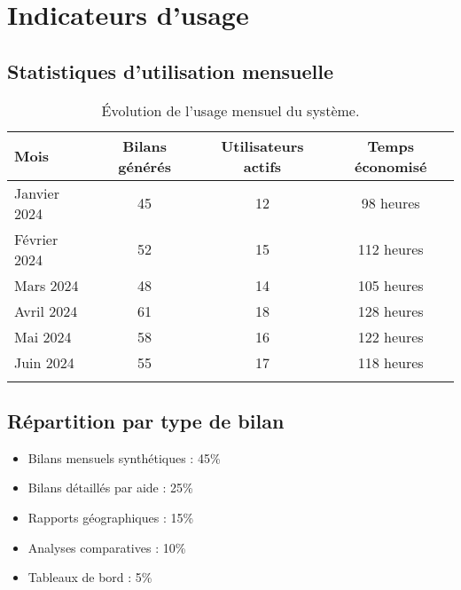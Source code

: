 \section{Indicateurs d'usage}

\subsection{Statistiques d'utilisation mensuelle}

\begin{longtable}{|l|c|c|c|}
    \hline
    \textbf{Mois} & \textbf{Bilans générés} & \textbf{Utilisateurs actifs} & \textbf{Temps économisé} \\ \hline
    Janvier 2024  & 45                      & 12                           & 98 heures                \\ \hline
    Février 2024  & 52                      & 15                           & 112 heures               \\ \hline
    Mars 2024     & 48                      & 14                           & 105 heures               \\ \hline
    Avril 2024    & 61                      & 18                           & 128 heures               \\ \hline
    Mai 2024      & 58                      & 16                           & 122 heures               \\ \hline
    Juin 2024     & 55                      & 17                           & 118 heures               \\ \hline
    \caption{Évolution de l'usage mensuel du système.}
    \label{tab:usage-mensuel}
\end{longtable}

\subsection{Répartition par type de bilan}

\begin{itemize}
    \item Bilans mensuels synthétiques : 45\%
    \item Bilans détaillés par aide : 25\%
    \item Rapports géographiques : 15\%
    \item Analyses comparatives : 10\%
    \item Tableaux de bord : 5\%
\end{itemize}

